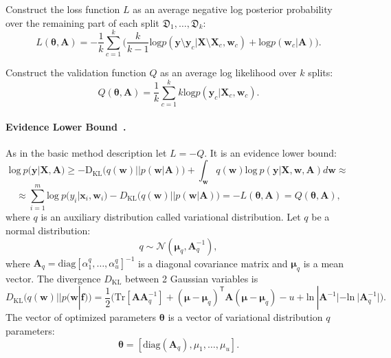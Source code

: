 \documentclass[smallcondensed]{svjour3}
\begin{document}
Construct the loss function $L$ as an average negative log posterior probability over the remaining part of each split $\mathfrak{D}_1, \dots, \mathfrak{D}_k$:  
\begin{equation}
\label{eq:cv}
L(\boldsymbol{\theta}, \mathbf{A}) = -\frac{1}{k}\sum_{c=1}^k \bigl(\frac{k}{k-1}\text{log}p(\mathbf{y} \setminus \mathbf{y}_c|\mathbf{X}\setminus \mathbf{X}_c, \mathbf{w}_c) + \text{log}p(\mathbf{w}_c|\mathbf{A})\bigr).
\end{equation}

Construct the validation function $Q$ as an average log likelihood over $k$ splits:
\begin{equation}
\label{eq:cvq}
Q(\boldsymbol{\theta}, \mathbf{A}) = \frac{1}{k}\sum_{c=1}^k k\text{log}p(\mathbf{y}_c|\mathbf{X}_c, \mathbf{w}_c).
\end{equation}

\paragraph{Evidence Lower Bound~\cite{nips}.}
As in the basic method description let $L=-Q$. It is an evidence lower bound:
\begin{equation} 
\label{eq:elbo}
\text{log}~p(\mathbf{y}|\mathbf{X},\mathbf{A})  
\geq 
-\text{D}_\text{KL} \bigl(q(\mathbf{w})||p(\mathbf{w}|\mathbf{A})\bigr) + \int_{\mathbf{w}} q(\mathbf{w})\text{log}~{p(\mathbf{y}|\mathbf{X},\mathbf{w},\mathbf{A})} d \mathbf{w}  \approx
\end{equation}
\[
\approx \sum_{i=1}^m \text{log}~p({y}_i|\mathbf{x}_i, \mathbf{w}_i) - D_\text{KL}\bigl(q (\mathbf{w}) || p (\mathbf{w}|\mathbf{A})\bigr) = -L(\boldsymbol{\theta}, \mathbf{A}) = Q(\boldsymbol{\theta}, \mathbf{A}),
\]
where $q$ is an auxiliary distribution called variational distribution. Let $q$ be a normal distribution:
\begin{equation}
\label{eq:diag}
	q \sim \mathcal{N}(\boldsymbol{\mu}_q, \mathbf{A}^{-1}_q),
\end{equation}
where $\mathbf{A}_q = \text{diag}[\alpha^q_1, \dots, \alpha^q_u]^{-1}$ is  a diagonal covariance matrix and $\boldsymbol{\mu}_q$ is a mean vector.
The divergence $D_\text{KL}$ between 2 Gaussian variables is 
\[
	D_\text{KL}\bigl(q (\mathbf{w}) || p (\mathbf{w}|\mathbf{f})\bigr) = \frac{1}{2} \bigl( \text{Tr} [\mathbf{A}\mathbf{A}^{-1}_q] + (\boldsymbol{\mu} - \boldsymbol{\mu}_q)^\mathsf{T}\mathbf{A}(\boldsymbol{\mu} - \boldsymbol{\mu}_q) - u +\text{ln}~|\mathbf{A}^{-1}| - \text{ln}~|\mathbf{A}_q^{-1}| \bigr).
\]
The vector of optimized parameters $\boldsymbol{\theta}$ is a vector of variational distribution $q$ parameters:
\[
\boldsymbol{\theta} = [\text{diag}(\mathbf{A}_q), {\mu}_1,\dots,{\mu}_u].
\]
\end{document}
